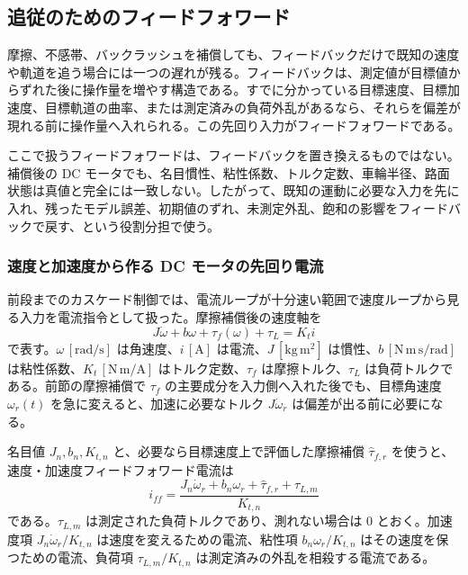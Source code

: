 \subsection{追従のためのフィードフォワード}

摩擦、不感帯、バックラッシュを補償しても、フィードバックだけで既知の速度や軌道を追う場合には一つの遅れが残る。フィードバックは、測定値が目標値からずれた後に操作量を増やす構造である。すでに分かっている目標速度、目標加速度、目標軌道の曲率、または測定済みの負荷外乱があるなら、それらを偏差が現れる前に操作量へ入れられる。この先回り入力がフィードフォワードである。

ここで扱うフィードフォワードは、フィードバックを置き換えるものではない。補償後の DC モータでも、名目慣性、粘性係数、トルク定数、車輪半径、路面状態は真値と完全には一致しない。したがって、既知の運動に必要な入力を先に入れ、残ったモデル誤差、初期値のずれ、未測定外乱、飽和の影響をフィードバックで戻す、という役割分担で使う。

\subsubsection{速度と加速度から作る DC モータの先回り電流}

前段までのカスケード制御では、電流ループが十分速い範囲で速度ループから見る入力を電流指令として扱った。摩擦補償後の速度軸を
\begin{equation}
  J\dot{\omega}+b\omega+\tau_f(\omega)+\tau_L=K_t i
  \label{eq:feedforward-motor-model}
\end{equation}
で表す。$\omega\,[\mathrm{rad/s}]$ は角速度、$i\,[\mathrm{A}]$ は電流、$J\,[\mathrm{kg\,m^2}]$ は慣性、$b\,[\mathrm{N\,m\,s/rad}]$ は粘性係数、$K_t\,[\mathrm{N\,m/A}]$ はトルク定数、$\tau_f$ は摩擦トルク、$\tau_L$ は負荷トルクである。前節の摩擦補償で $\tau_f$ の主要成分を入力側へ入れた後でも、目標角速度 $\omega_r(t)$ を急に変えると、加速に必要なトルク $J\dot{\omega}_r$ は偏差が出る前に必要になる。

名目値 $J_n,b_n,K_{t,n}$ と、必要なら目標速度上で評価した摩擦補償 $\hat{\tau}_{f,r}$ を使うと、速度・加速度フィードフォワード電流は
\begin{equation}
  i_{ff}
  =
  \frac{
    J_n\dot{\omega}_r
    +b_n\omega_r
    +\hat{\tau}_{f,r}
    +\tau_{L,m}
  }{K_{t,n}}
  \label{eq:speed-acceleration-feedforward}
\end{equation}
である。$\tau_{L,m}$ は測定された負荷トルクであり、測れない場合は 0 とおく。加速度項 $J_n\dot{\omega}_r/K_{t,n}$ は速度を変えるための電流、粘性項 $b_n\omega_r/K_{t,n}$ はその速度を保つための電流、負荷項 $\tau_{L,m}/K_{t,n}$ は測定済みの外乱を相殺する電流である。

